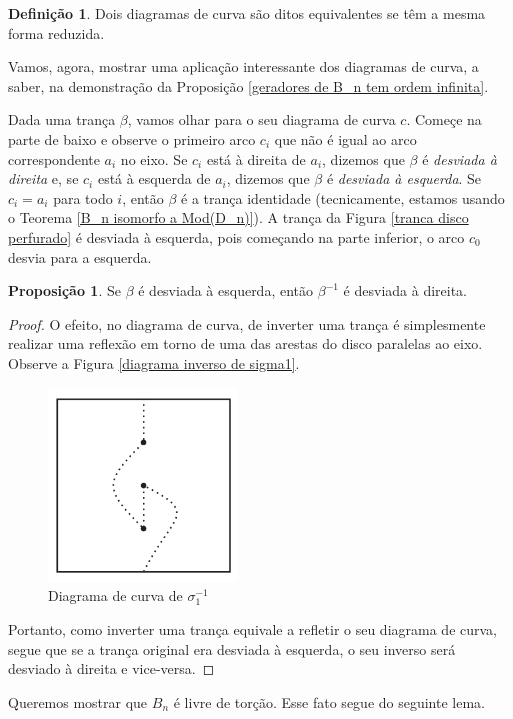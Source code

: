 \documentclass[a4paper,portuguese,11pt,twoside, leqno]{book}
\theoremstyle{definition}
\newtheorem{deff}{Definição}[section]
\newtheorem{prop}{Proposição}[section]
\begin{document}
	\begin{deff}
		\label{def equivalencia diagramas}
		Dois diagramas de curva são ditos equivalentes se têm a mesma forma reduzida.
	\end{deff}  
	\par\vspace{0.3cm} Vamos, agora, mostrar uma aplicação interessante dos diagramas de curva, a saber, na demonstração da Proposição \eqref{geradores de B_n tem ordem infinita}.
	\par\vspace{0.3cm} Dada uma trança $\beta$, vamos olhar para o seu diagrama de curva $c$. Começe na parte de baixo e observe o primeiro arco $c_i$ que não é igual ao arco correspondente $a_i$ no eixo. Se $c_i$ está à direita de $a_i$, dizemos que $\beta$ é \textit{desviada à direita} e, se $c_i$ está à esquerda de $a_i$, dizemos que $\beta$ é \textit{desviada à esquerda}. Se $c_i = a_i$ para todo $i$, então $\beta$ é a trança identidade (tecnicamente, estamos usando o Teorema \eqref{B_n isomorfo a Mod(D_n)}). A trança da Figura \eqref{tranca disco perfurado} é desviada à esquerda, pois começando na parte inferior, o arco $c_0$ desvia para a esquerda.
	\begin{prop}
		\label{desvio a direita desvio a esquerda}
		Se $\beta$ é desviada à esquerda, então $\beta^{-1}$ é desviada à direita.
	\end{prop}
	\begin{proof}
		O efeito, no diagrama de curva, de inverter uma trança é simplesmente realizar uma reflexão em torno de uma das arestas do disco paralelas ao eixo. Observe a Figura \eqref{diagrama inverso de sigma1}.
		\begin{figure}[H]
			\begin{center}
				\includegraphics[width=5cm]{Images/inverso.png}
			\end{center}\caption{Diagrama de curva de $\sigma_1^{-1}$}\label{diagrama inverso de sigma1}
		\end{figure}
		\par\vspace{0.3cm} Portanto, como inverter uma trança equivale a refletir o seu diagrama de curva, segue que se a trança original era desviada à esquerda, o seu inverso será desviado à direita e vice-versa.
	\end{proof}
	\par\vspace{0.3cm} Queremos mostrar que $B_n$ é livre de torção. Esse fato segue do seguinte lema.
	
\end{document}
